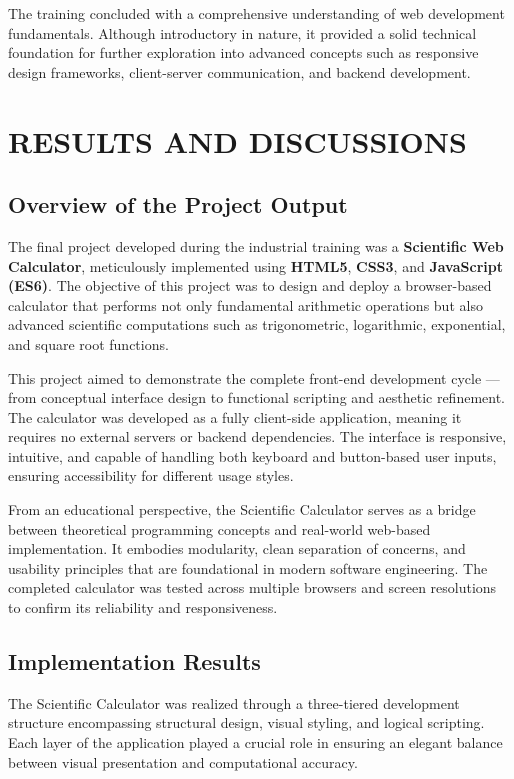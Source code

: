 \documentclass[a4paper,12pt,oneside]{report}
\numberwithin{equation}{chapter}
\numberwithin{figure}{chapter}
\numberwithin{table}{chapter}
\begin{document}
\vspace{3mm}
The training concluded with a comprehensive understanding of web development fundamentals. Although introductory in nature, it provided a solid technical foundation for further exploration into advanced concepts such as responsive design frameworks, client-server communication, and backend development.


\newpage
\chapter{RESULTS AND DISCUSSIONS}

\section{Overview of the Project Output}

The final project developed during the industrial training was a \textbf{Scientific Web Calculator}, meticulously implemented using \textbf{HTML5}, \textbf{CSS3}, and \textbf{JavaScript (ES6)}. The objective of this project was to design and deploy a browser-based calculator that performs not only fundamental arithmetic operations but also advanced scientific computations such as trigonometric, logarithmic, exponential, and square root functions. 

This project aimed to demonstrate the complete front-end development cycle — from conceptual interface design to functional scripting and aesthetic refinement. The calculator was developed as a fully client-side application, meaning it requires no external servers or backend dependencies. The interface is responsive, intuitive, and capable of handling both keyboard and button-based user inputs, ensuring accessibility for different usage styles.

From an educational perspective, the Scientific Calculator serves as a bridge between theoretical programming concepts and real-world web-based implementation. It embodies modularity, clean separation of concerns, and usability principles that are foundational in modern software engineering. The completed calculator was tested across multiple browsers and screen resolutions to confirm its reliability and responsiveness.

\bigskip
\noindent
\section{Implementation Results}

The Scientific Calculator was realized through a three-tiered development structure encompassing structural design, visual styling, and logical scripting. Each layer of the application played a crucial role in ensuring an elegant balance between visual presentation and computational accuracy.
\end{document}
